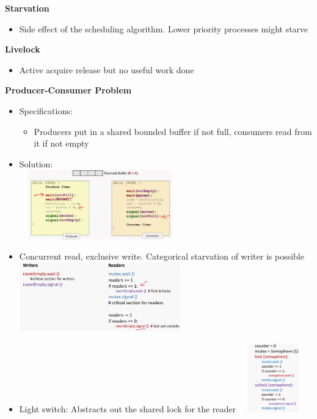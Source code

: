 \documentclass[10pt, landscape]{article}
\begin{document}
\begin{multicols}{4}
\textbf{Starvation}
\begin{itemize}
    \item Side effect of the scheduling algorithm. Lower priority processes might starve
\end{itemize}

\textbf{Livelock}
\begin{itemize}
    \item Active acquire release but no useful work done 
\end{itemize}

\textbf{Producer-Consumer Problem} \\
\begin{itemize}
    \item Specifications:
    \begin{itemize}
        \item Producers put in a shared bounded buffer if not full, consumers read from it if not empty
    \end{itemize}
    \item Solution:\\
    \includegraphics*[width = 7cm, height = 3cm]{producerConsumer.png} \\ 
    \item Concurrent read, exclusive write. Categorical starvation of writer is possible\\ 
    \includegraphics*[width = 7cm, height = 3cm]{readerwritter1.png} \\
    \item Light switch: Abstracts out the shared lock for the reader 
    \includegraphics*[width = 3cm, height = 3cm]{lightswitch.png} \\

\end{itemize}
\end{multicols}
\end{document}
